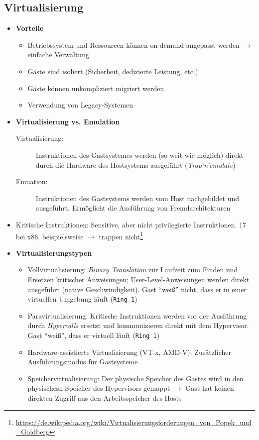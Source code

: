 \subsection{Virtualisierung}
\begin{itemize}
	\item \textbf{Vorteile}
	\begin{itemize}
		\item Betriebssystem und Ressourcen können on-demand angepasst werden \(\rightarrow\) einfache Verwaltung
		\item Gäste sind isoliert (Sicherheit, dedizierte Leistung, etc.)
		\item Gäste können unkompliziert migriert werden
		\item Verwendung von Legacy-Systemen
	\end{itemize}
	\item \textbf{Virtualisierung vs. Emulation}
	\begin{description}
		\item[Virtualisierung:] Instruktionen des Gastsystemes werden (so weit wie möglich) direkt durch die Hardware des Hostsystems ausgeführt (\textit{Trap'n'emulate})
		\item[Emuation:] Instruktionen des Gastsystems werden vom Host nachgebildet und ausgeführt. Ermöglicht die Ausführung von Fremdarchitekturen
	\end{description}
	\item Kritische Instruktionen: Sensitive, aber nicht privilegierte Instruktionen. 17 bei x86, beispielsweise  \(\rightarrow\) trappen nicht\footnote{\url{https://de.wikipedia.org/wiki/Virtualisierungsforderungen_von_Popek_und_Goldberg}}
	\item \textbf{Virtualisierungstypen}
	\begin{itemize}
		\item Vollvirtualisierung: \textit{Binary Translation} zur Laufzeit zum Finden und Ersetzen kritischer Anweisungen; User-Level-Anweisungen werden direkt ausgeführt (native Geschwindigkeit). Gast "`weiß"' nicht, dass er in einer virtuellen Umgebung läuft (\texttt{Ring 1})
		\item Paravirtualisierung: Kritische Instruktionen werden vor der Ausführung durch \textit{Hypercalls} ersetzt und kommunizieren direkt mit dem Hypervisor. Gast "`weiß"', dass er virtuell läuft (\texttt{Ring 1})
		\item Hardware-assistierte Virtualisierung (VT-x, AMD-V): Zusätzlicher Ausführungsmodus für Gastsysteme
		\item Speichervirtualisierung: Der physische Speicher des Gastes wird in den physischesn Speicher des Hypervisors gemappt \(\rightarrow\) Gast hat keinen direkten Zugriff aus den Arbeitsspeicher des Hosts

\end{itemize}
\end{itemize}
